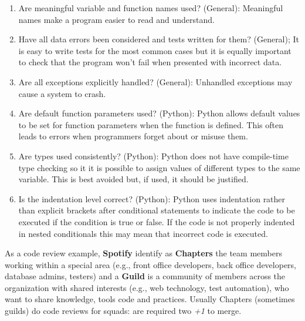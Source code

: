 \documentclass[10pt,a4paper]{report}
\begin{document}
\begin{enumerate}
	\item Are meaningful variable and function names used? (General): Meaningful names make a program easier to read and understand.
	\item  Have all data errors been considered and tests written for them? (General); It is easy to write tests for the most common cases but it is equally important to check that the program won’t fail when presented with incorrect data.
	\item Are all exceptions explicitly handled? (General):	Unhandled exceptions may cause a system to crash.
	\item Are default function parameters used? (Python): Python allows default values to be set for function parameters when the function is defined. This
	often leads to errors when programmers forget about or misuse them.
	\item Are types used consistently? (Python): Python does not have compile-time type checking so it it is possible to assign values of different
	types to the same variable. This is best avoided but, if used, it should be justified.
	\item Is the indentation level correct? (Python): Python uses indentation rather than explicit brackets after conditional statements to indicate the
	code to be executed if the condition is true or false. If the code is not properly indented in nested 	conditionals this may mean that incorrect code is executed.
\end{enumerate}
As a code review example, \textbf{Spotify} identify as \textbf{Chapters} the team members working within a special area (e.g., front office developers, back office developers, database admins, testers) and a \textbf{Guild} is a community of members across the organization with shared interests (e.g., web technology, test automation), who want to share knowledge, tools code and practices. Usually Chapters (sometimes guilds) do code reviews for squads: are required two \textit{+1} to merge. 
\end{document}
